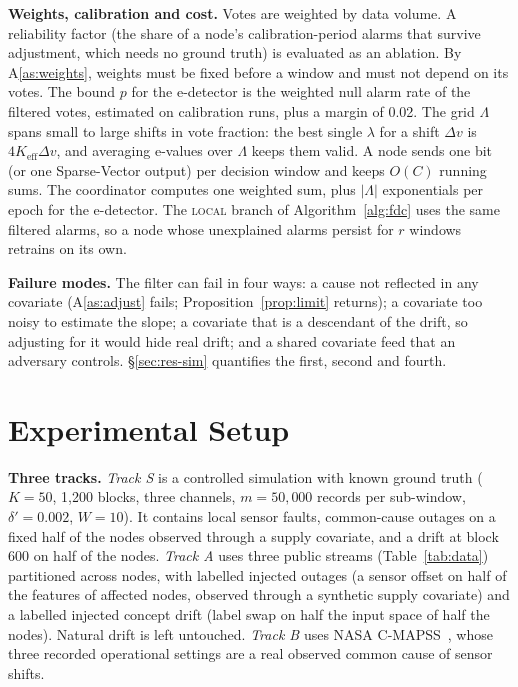 \IfFileExists{IEEEtran.cls}{\documentclass[journal]{IEEEtran}\newcommand{\ieeemode}{}}{\documentclass[10pt,twocolumn,letterpaper]{article}\usepackage[margin=0.72in,columnsep=0.22in]{geometry}}
\newcommand{\Keff}{K_{\mathrm{eff}}}
\begin{document}
\noindent\textbf{Weights, calibration and cost.} Votes are weighted by data volume. A reliability factor (the share of a node's calibration-period alarms that survive adjustment, which needs no ground truth) is evaluated as an ablation. By A\ref{as:weights}, weights must be fixed before a window and must not depend on its votes. The bound $p$ for the e-detector is the weighted null alarm rate of the filtered votes, estimated on calibration runs, plus a margin of 0.02. The grid $\Lambda$ spans small to large shifts in vote fraction: the best single $\lambda$ for a shift $\Delta v$ is $4\Keff\Delta v$, and averaging e-values over $\Lambda$ keeps them valid. A node sends one bit (or one Sparse-Vector output) per decision window and keeps $O(C)$ running sums. The coordinator computes one weighted sum, plus $|\Lambda|$ exponentials per epoch for the e-detector. The \textsc{local} branch of Algorithm~\ref{alg:fdc} uses the same filtered alarms, so a node whose unexplained alarms persist for $r$ windows retrains on its own.

\noindent\textbf{Failure modes.} The filter can fail in four ways: a cause not reflected in any covariate (A\ref{as:adjust} fails; Proposition~\ref{prop:limit} returns); a covariate too noisy to estimate the slope; a covariate that is a descendant of the drift, so adjusting for it would hide real drift; and a shared covariate feed that an adversary controls. \S\ref{sec:res-sim} quantifies the first, second and fourth.

\section{Experimental Setup}\label{sec:setup}
\noindent\textbf{Three tracks.} \emph{Track S} is a controlled simulation with known ground truth ($K=50$, 1,200 blocks, three channels, $m=50{,}000$ records per sub-window, $\delta'=0.002$, $W=10$). It contains local sensor faults, common-cause outages on a fixed half of the nodes observed through a supply covariate, and a drift at block 600 on half of the nodes. \emph{Track A} uses three public streams (Table~\ref{tab:data}) partitioned across nodes, with labelled injected outages (a sensor offset on half of the features of affected nodes, observed through a synthetic supply covariate) and a labelled injected concept drift (label swap on half the input space of half the nodes). Natural drift is left untouched. \emph{Track B} uses NASA C-MAPSS~\cite{saxena2008cmapss}, whose three recorded operational settings are a real observed common cause of sensor shifts.
\end{document}
